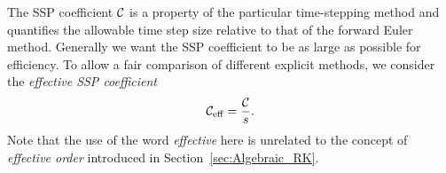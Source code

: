 
The SSP coefficient $\mathcal{C}$ is a property of the particular
time-stepping method and quantifies the allowable time step size relative 
to that of the forward Euler method.
Generally we want the SSP coefficient to be as large as possible for efficiency.
To allow a fair comparison of different explicit methods, we consider the 
\emph{effective SSP coefficient}
\begin{align*}
	\mathcal{C}_{\text{eff}} = \frac{\mathcal{C}}{s}.
\end{align*}
Note that the use of the word \emph{effective} here is unrelated to the 
concept of \emph{effective order} introduced in Section~\ref{sec:Algebraic_RK}.


